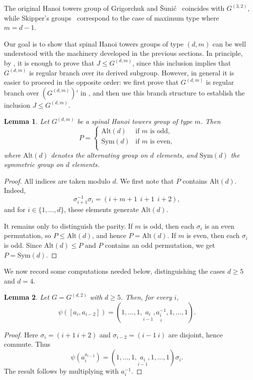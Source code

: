 \documentclass[11pt,leqno]{amsart}
\theoremstyle{plain}
\newtheorem{lemma}[lemma]{Lemma}
\newcommand{\alt}{\mathrm{Alt}}
\newcommand{\Sym}{\mathrm{Sym}}
\numberwithin{equation}{section}
\begin{document}
The original Hanoi towers group of Grigorchuk and \v{S}uni\'c~\cite{Sunic} coincides with $G^{(3,2)}$, while Skipper's groups~\cite{Rachel} correspond to the case of maximum type where $m=d-1$.


Our goal is to show that spinal Hanoi towers groups of type $(d,m)$ can be well understood with the machinery developed in the previous sections. In principle, by , it is enough to prove that $J\leq G^{(d,m)}$, since this inclusion implies that $G^{(d,m)}$ is regular branch over its derived subgroup. However, in general it is easier to proceed in the opposite order: we first prove  that $G^{(d,m)}$ is regular branch over $(G^{(d,m)})'$ in , and then use this branch structure to establish the inclusion $J\leq G^{(d,m)}$.


\begin{lemma}\label{permutationgenerating}
   Let $G^{(d,m)}$ be a spinal Hanoi towers group of type $m$. Then
   $$P=\begin{cases}
\alt(d) & \text{if $m$ is odd,}\\
\Sym(d) & \text{if $m$ is even,} \\
\end{cases}$$
where $\alt(d)$ denotes the alternating group on $d$ elements, and $\Sym(d)$ the symmetric group on $d$ elements.
\end{lemma}
\begin{proof}
	All indices are taken modulo $d$. We first note that $P$ contains $\alt(d)$. Indeed,
	\[
	\sigma_{i+1}^{-1}\sigma_i=(i+m+1\ \ i+1\ \ i+2),
	\]
    and for $i\in\{1,\ldots,d\}$, these  elements generate $\alt(d)$.
	
	It remains only to distinguish the parity. If $m$ is odd, then each $\sigma_i$ is an even permutation, so $P\leq \alt(d)$, and hence $P=\alt(d)$. If $m$ is even, then each $\sigma_i$ is odd. Since $\alt(d)\leq P$ and $P$ contains an odd permutation, we get $P=\Sym(d)$.
\end{proof}


We now record  some computations needed below, distinguishing the cases $d\geq 5$ and $d=4$.

\begin{lemma}\label{lem:sections-m2}
	Let $G=G^{(d,2)}$ with $d\geq 5$. Then, for every $i$,
	\[
	\psi([a_i,a_{i-2}])
	=(1,\ldots,1,
	\underset{i-1}{a_i},
	\underset{i}{a_i^{-1}},1,\ldots,1).
	\]
\end{lemma}

\begin{proof}
	Here $\sigma_i=(i+1\ i+2)$ and $\sigma_{i-2}=(i-1\ i)$ are disjoint, hence commute. Thus
	\[
	\psi(a_i^{a_{i-2}})
	=(1,\ldots,1,\underset{i-1}{a_i},1,\ldots,1)\sigma_i.
	\]
	The result follows by multiplying with $a_i^{-1}$.
\end{proof}
\end{document}
